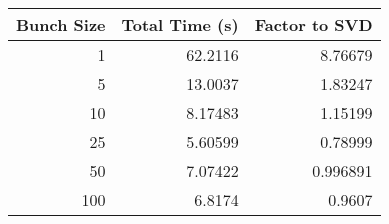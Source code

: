 \begin{tabular}{rrr}
\toprule
   Bunch Size &   Total Time (s) &   Factor to SVD \\
\midrule
            1 &         62.2116  &        8.76679  \\
            5 &         13.0037  &        1.83247  \\
           10 &          8.17483 &        1.15199  \\
           25 &          5.60599 &        0.78999  \\
           50 &          7.07422 &        0.996891 \\
          100 &          6.8174  &        0.9607   \\
\bottomrule
\end{tabular}